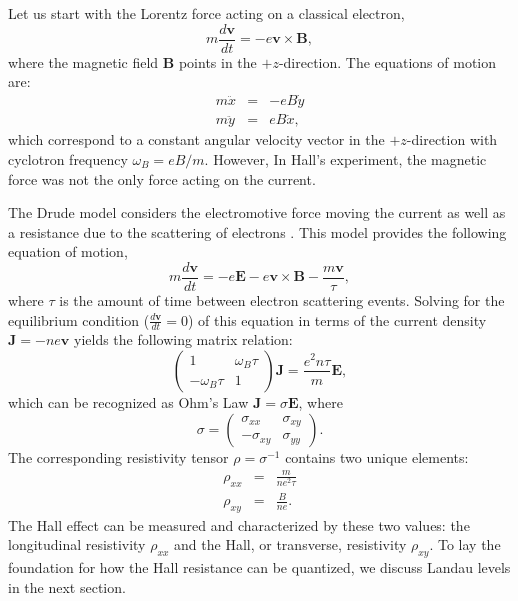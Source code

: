     Let us start with the Lorentz force acting on a classical electron,
    \begin{equation} \label{lorForce}
    m\frac{d\mathbf{v}}{dt}=-e\mathbf{v}\times \mathbf{B},
    \end{equation}
    where the magnetic field $\mathbf{B}$ points in the $+z$-direction. The equations of motion are:
    \begin{eqnarray} \label{cycmot}
    m\ddot{x} &=& -eB\dot{y}\\
    m\ddot{y} &=& eB\dot{x},
    \end{eqnarray}
    which correspond to a constant angular velocity vector in the $+z$-direction with cyclotron frequency $\omega_B=eB/m$. However, In Hall's experiment, the magnetic force was not the only force acting on the current.
    
    The Drude model considers the electromotive force moving the current as well as a resistance due to the scattering of electrons \cite{simon}. This model provides the following equation of motion,
    \begin{equation} \label{drud}
    m\frac{d\textbf{v}}{dt}=-e\textbf{E}-e\textbf{v}\times \textbf{B}-\frac{m\textbf{v}}{\tau},
    \end{equation}
    where $\tau$ is the amount of time between electron scattering events. Solving for the equilibrium condition ($\frac{d\textbf{v}}{dt}=0$) of this equation in terms of the current density $\textbf{J}=-ne\textbf{v}$ yields the following matrix relation:
    \begin{equation} \label{currDens}
    \begin{pmatrix}
    1 & \omega_B\tau\\
    -\omega_B\tau & 1
    \end{pmatrix}
    \textbf{J}=\frac{e^2n\tau}{m}\textbf{E},
    \end{equation}
    which can be recognized as Ohm's Law $\textbf{J}=\sigma\textbf{E}$, where
    \begin{equation} \label{ohmsLaw}
    \sigma =
    \begin{pmatrix}
    \sigma_{xx} & \sigma_{xy}\\
    -\sigma_{xy} & \sigma_{yy}
    \end{pmatrix}.
    \end{equation}
    The corresponding resistivity tensor $\rho=\sigma^{-1}$ contains two unique elements:
    \begin{eqnarray} \label{hallRes}
    \rho_{xx} &=& \frac{m}{ne^2\tau}\\
    \rho_{xy} &=& \frac{B}{ne}.
    \end{eqnarray}
    The Hall effect can be measured and characterized by these two values: the longitudinal resistivity $\rho_{xx}$ and the Hall, or transverse, resistivity $\rho_{xy}$. To lay the foundation for how the Hall resistance can be quantized, we discuss Landau levels in the next section.
	
